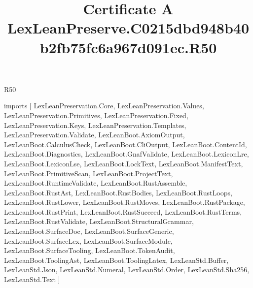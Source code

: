\begin{lexlean}{R50}
\title{Certificate A LexLeanPreserve.C0215dbd948b40b2fb75fc6a967d091ec.R50}
\begin{coremodule}
imports [
  LexLeanPreservation.Core,
  LexLeanPreservation.Values,
  LexLeanPreservation.Primitives,
  LexLeanPreservation.Fixed,
  LexLeanPreservation.Keys,
  LexLeanPreservation.Templates,
  LexLeanPreservation.Validate,
  LexLeanBoot.AxiomOutput,
  LexLeanBoot.CalculusCheck,
  LexLeanBoot.CliOutput,
  LexLeanBoot.ContentId,
  LexLeanBoot.Diagnostics,
  LexLeanBoot.GnafValidate,
  LexLeanBoot.LexiconLre,
  LexLeanBoot.LexiconLse,
  LexLeanBoot.LockText,
  LexLeanBoot.ManifestText,
  LexLeanBoot.PrimitiveScan,
  LexLeanBoot.ProjectText,
  LexLeanBoot.RuntimeValidate,
  LexLeanBoot.RustAssemble,
  LexLeanBoot.RustAst,
  LexLeanBoot.RustBodies,
  LexLeanBoot.RustLoops,
  LexLeanBoot.RustLower,
  LexLeanBoot.RustMoves,
  LexLeanBoot.RustPackage,
  LexLeanBoot.RustPrint,
  LexLeanBoot.RustSucceed,
  LexLeanBoot.RustTerms,
  LexLeanBoot.RustValidate,
  LexLeanBoot.StructuralGrammar,
  LexLeanBoot.SurfaceDoc,
  LexLeanBoot.SurfaceGeneric,
  LexLeanBoot.SurfaceLex,
  LexLeanBoot.SurfaceModule,
  LexLeanBoot.SurfaceTooling,
  LexLeanBoot.TokenAudit,
  LexLeanBoot.ToolingAst,
  LexLeanBoot.ToolingLatex,
  LexLeanStd.Buffer,
  LexLeanStd.Json,
  LexLeanStd.Numeral,
  LexLeanStd.Order,
  LexLeanStd.Sha256,
  LexLeanStd.Text
]


\end{coremodule}
\end{lexlean}
